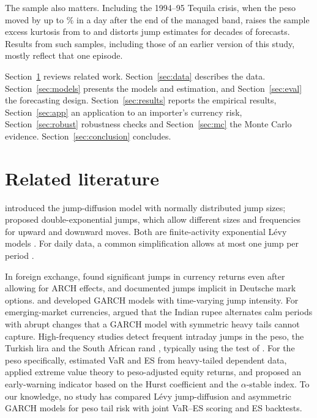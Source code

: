 \documentclass[11pt]{article}
\begin{document}
The sample also matters. Including the 1994--95 Tequila crisis, when the peso moved by up to \maxFull\% in a day after the end of the managed band, raises the sample excess kurtosis from \kurtMain{} to \kurtFull{} and distorts jump estimates for decades of forecasts. Results from such samples, including those of an earlier version of this study, mostly reflect that one episode.

Section~\ref{sec:lit} reviews related work. Section~\ref{sec:data} describes the data. Section~\ref{sec:models} presents the models and estimation, and Section~\ref{sec:eval} the forecasting design. Section~\ref{sec:results} reports the empirical results, Section~\ref{sec:app} an application to an importer's currency risk, Section~\ref{sec:robust} robustness checks and Section~\ref{sec:mc} the Monte Carlo evidence. Section~\ref{sec:conclusion} concludes.

\section{Related literature}\label{sec:lit}

\citet{merton1976} introduced the jump-diffusion model with normally distributed jump sizes; \citet{kou2002} proposed double-exponential jumps, which allow different sizes and frequencies for upward and downward moves. Both are finite-activity exponential Lévy models \citep{sato1999,conttankov2004}. For daily data, a common simplification allows at most one jump per period \citep{balltorous1983}.

In foreign exchange, \citet{jorion1988} found significant jumps in currency returns even after allowing for ARCH effects, and \citet{bates1996} documented jumps implicit in Deutsche mark options. \citet{chanmaheu2002} and \citet{maheumccurdy2004} developed GARCH models with time-varying jump intensity. For emerging-market currencies, \citet{varma1999} argued that the Indian rupee alternates calm periods with abrupt changes that a GARCH model with symmetric heavy tails cannot capture. High-frequency studies detect frequent intraday jumps in the peso, the Turkish lira and the South African rand \citep{serdengecti2021,uzun2023}, typically using the test of \citet{leemykland2008}. For the peso specifically, \citet{novak2007} estimated VaR and ES from heavy-tailed dependent data, \citet{gutierrezortiz2013} applied extreme value theory to peso-adjusted equity returns, and \citet{rodriguez2014} proposed an early-warning indicator based on the Hurst coefficient and the $\alpha$-stable index. To our knowledge, no study has compared Lévy jump-diffusion and asymmetric GARCH models for peso tail risk with joint VaR--ES scoring and ES backtests.
\end{document}
